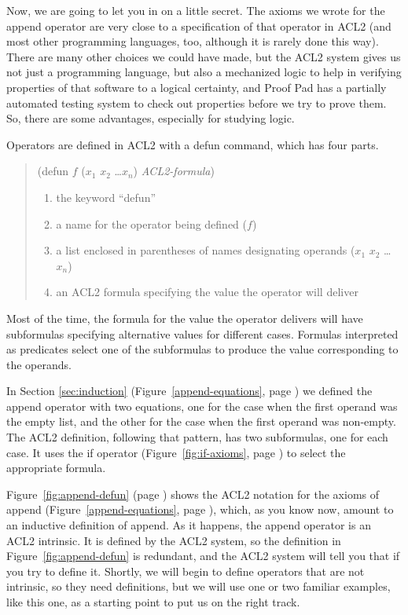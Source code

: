 Now, we are going to let you in on a little secret.
The axioms we wrote for the append operator are very
close to a specification of that operator in ACL2
(and most other programming languages, too, although
it is rarely done this way).
There are many other choices we could have made,
but the ACL2 system gives us not just a programming language,
but also a mechanized logic to help in verifying properties of
that software to a logical certainty,
and Proof Pad has a partially automated testing system to
check out properties before we try to prove them.
So, there are some advantages, especially for studying logic.

Operators are defined in ACL2 with a defun command,
which has four parts.
\begin{quote}
(defun $f$ ($x_1$ $x_2$ \dots $x_n$) \emph{ACL2-formula})

\begin{enumerate}
\item the keyword ``defun''
\item a name for the operator being defined ($f$)
\item a list enclosed in parentheses of names designating operands ($x_1$ $x_2$ \dots $x_n$)
\item an ACL2 formula specifying the value the operator will deliver
\end{enumerate}
\end{quote}

Most of the time, the formula for the value the operator delivers
will have subformulas specifying alternative values for different cases.
Formulas interpreted as predicates select one of
the subformulas to produce the value corresponding to the operands.

In Section \ref{sec:induction} (Figure~\ref{append-equations}, page \pageref{append-equations})
we defined the append operator with two equations,
one for the case when the first operand was the empty list,
and the other for the case when the first operand was non-empty.
The ACL2 definition, following that pattern, has two subformulas,
one for each case.
It uses the if operator
(Figure~\ref{fig:if-axioms}, page \pageref{fig:if-axioms})
to select the appropriate formula.

Figure~\ref{fig:append-defun} (page \pageref{fig:append-defun})
shows the ACL2 notation for the axioms of append
(Figure~\ref{append-equations}, page \pageref{append-equations}),
which, as you know now, amount to an inductive definition of append.
As it happens, the append operator is an ACL2 intrinsic.
It is defined by the ACL2 system, so the definition
in Figure~\ref{fig:append-defun} is redundant,
and the ACL2 system will tell you that if you try to define it.
Shortly, we will begin to define operators that are not
intrinsic, so they need definitions,
but we will use one or two familiar examples, like this one,
as a starting point to put us on the right track.

